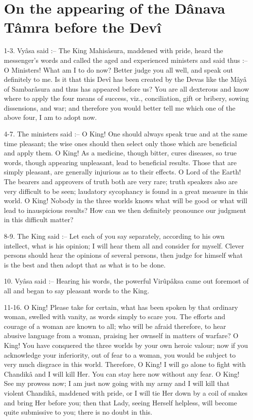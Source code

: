 ﻿\chapter{On the appearing of the D\^anava T\^amra before the Dev\^i}

1-3. Vy\^asa said :-- The King Mahis\^asura, maddened with pride, heard the messenger's words and called the aged and experienced ministers and said thus :-- O Ministers! What am I to do now? Better judge you all well, and speak out definitely to me. Is it that this Dev\^i has been created by the Devas like the M\^ay\^a of Sambar\^asura and thus has appeared before us? You are all dexterous and know where to apply the four means of success, viz., conciliation, gift or bribery, sowing dissensions, and war; and therefore you would better tell me which one of the above four, I am to adopt now.

4-7. The ministers said :-- O King! One should always speak true and at the same time pleasant; the wise ones should then select only those which are beneficial and apply them. O King! As a medicine, though bitter, cures diseases, so true words, though appearing unpleasant, lead to beneficial results. Those that are simply pleasant, are generally injurious as to their effects. O Lord of the Earth! The bearers and approvers of truth both are very rare; truth speakers also are very difficult to be seen; laudatory sycophancy is found in a great measure in this world. O King! Nobody in the three worlds knows what will be good or what will lead to inauspicious results? How can we then definitely pronounce our judgment in this difficult matter?

8-9. The King said :-- Let each of you say separately, according to his own intellect, what is his opinion; I will hear them all and consider for myself. Clever persons should hear the opinions of several persons, then judge for himself what is the best and then adopt that as what is to be done.

10. Vy\^asa said :-- Hearing his words, the powerful Vir\^up\^aksa came out foremost of all and began to say pleasant words to the King.

11-16. O King! Please take for certain, what has been spoken by that ordinary woman, swelled with vanity, as words simply to scare you. The efforts and courage of a woman are known to all; who will be afraid therefore, to hear abusive language from a woman, praising her ownself in matters of warfare? O King! You have conquered the three worlds by your own heroic valour; now if you acknowledge your inferiority, out of fear to a woman, you would be subject to very much disgrace in this world. Therefore, O King! I will go alone to fight with Chandik\^a and I will kill Her. You can stay here now without any fear. O King! See my prowess now; I am just now going with my army and I will kill that violent Chandik\^a, maddened with pride, or I will tie Her down by a coil of snakes and bring Her before you; then that Lady, seeing Herself helpless, will become quite submissive to you; there is no doubt in this.

